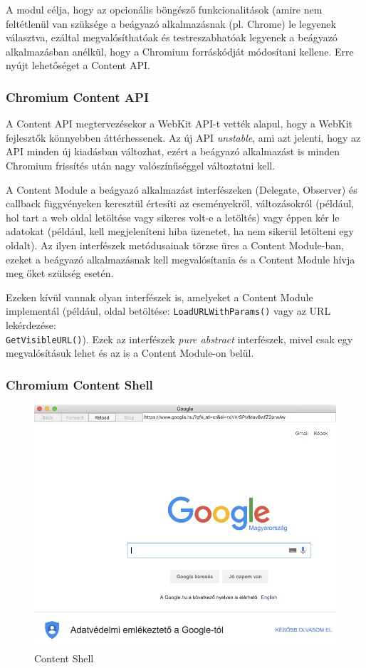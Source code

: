 \documentclass[12pt]{report}
\begin{document}
A modul célja, hogy az opcionális böngésző funkcionalitások (amire nem feltétlenül van
szüksége a beágyazó alkalmazásnak (pl. Chrome) le legyenek választva, ezáltal
megvalósíthatóak és testreszabhatóak legyenek a beágyazó alkalmazásban anélkül,
hogy a Chromium forráskódját módosítani kellene. Erre nyújt lehetőséget a Content API.

\subsubsection{Chromium Content API}
A Content API megtervezésekor a WebKit API-t vették alapul, hogy a WebKit fejlesztők
könnyebben áttérhessenek. Az új API \textit{unstable}, ami azt jelenti, hogy az API minden
új kiadásban változhat, ezért a beágyazó alkalmazást is minden Chromium frissítés után nagy
valószínűséggel változtatni kell.

A Content Module a beágyazó alkalmazást interfészeken (Delegate, Observer)
és callback függvényeken keresztül értesíti az eseményekről, változásokról (például,
hol tart a web oldal letöltése vagy sikeres volt-e a letöltés) vagy éppen
kér le adatokat (például, kell megjeleníteni hiba üzenetet, ha nem sikerül letölteni egy
oldalt). Az ilyen interfészek metódusainak törzse üres a Content Module-ban, ezeket a
beágyazó alkalmazásnak kell megvalósítania és a Content Module hívja meg őket szükség esetén.

Ezeken kívül vannak olyan interfészek is, amelyeket a Content Module implementál
(például, oldal betöltése: \texttt{LoadURLWithParams()} vagy az URL lekérdezése: \\
\texttt{GetVisibleURL()}).
Ezek az interfészek \textit{pure abstract} interfészek, mivel csak egy megvalósításuk lehet
és az is a Content Module-on belül. \cite{bib:chromium-content-api}

\subsubsection{Chromium Content Shell}
\begin{figure}[h]
    \centering
    \includegraphics[scale=0.5]{content-shell}
    \caption{
        \label{fig:content-shell}
        Content Shell
    }
\end{figure}
\end{document}

